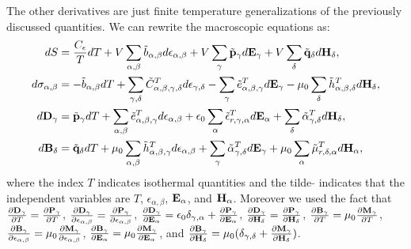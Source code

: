 \documentclass[12pt,a4paper]{article}
\begin{document}
The other derivatives are just finite temperature generalizations of the
previously discussed quantities. We can rewrite the macroscopic equations as:
\begin{align}
dS&= {C_\epsilon\over T} dT+ V \sum_{\alpha,\beta} \tilde b_{\alpha,\beta} 
d\epsilon_{\alpha,\beta}
+ V \sum_\gamma \tilde {\bf p}_\gamma d{\bf E}_{\gamma} +
V \sum_\delta \tilde {\bf q}_\delta d{\bf H}_{\delta}, \\
d\sigma_{\alpha,\beta}&= -\tilde b_{\alpha,\beta} dT + 
\sum_{\gamma,\delta} \tilde C^T_{\alpha,\beta,\gamma,\delta} 
d \epsilon_{\gamma,\delta} - \sum_\gamma \tilde e^T_{\alpha,\beta,\gamma} 
d{\bf E}_{\gamma} -\mu_0 
\sum_\delta \tilde h^T_{\alpha,\beta,\delta} d{\bf H}_{\delta}, \\
d{\bf D}_\gamma&=
\tilde {\bf p}_\gamma dT + \sum_{\alpha,\beta} \tilde 
e^T_{\alpha,\beta,\gamma} d\epsilon_{\alpha,\beta}
+\epsilon_0 \sum_\alpha \tilde \epsilon^T_{r,\gamma,\alpha} 
d{\bf E}_{\alpha} + 
\sum_\delta \tilde \alpha^T_{\gamma,\delta} d{\bf H}_{\delta}, 
\label{dsi} \\
d{\bf B}_\delta&=
\tilde {\bf q}_\delta dT+\mu_0 \sum_{\alpha,\beta}
\tilde h^T_{\alpha,\beta,\gamma}
d\epsilon_{\alpha,\beta}
+\sum_\gamma \tilde \alpha^T_{\gamma,\delta}
d{\bf E}_{\gamma}+ \mu_0
\sum_\alpha \tilde \mu^{T}_{r,\delta,\alpha}
d{\bf H}_{\alpha}, \label{bsi}
\end{align}
where the index $T$ indicates isothermal quantities and 
the tilde $\tilde{ }$ indicates that the independent variables are
$T$, $\epsilon_{\alpha,\beta}$, ${\bf E}_\alpha$, and ${\bf H}_\alpha$. 
Moreover we used the fact
that 
${\partial {\bf D}_\gamma \over \partial T} =
{\partial {\bf P}_\gamma \over \partial T}$,
${\partial {\bf D}_\gamma \over \partial \epsilon_{\alpha,\beta}}=
{\partial {\bf P}_\gamma \over \partial \epsilon_{\alpha,\beta}}$,
${\partial {\bf D}_\gamma \over \partial {\bf E}_{\alpha}}= \epsilon_0 
\delta_{\gamma,\alpha} +
{\partial {\bf P}_\gamma \over \partial {\bf E}_{\alpha}}$, 
${\partial {\bf D}_\gamma \over \partial {\bf H}_{\delta}}= 
{\partial {\bf P}_\gamma \over \partial {\bf H}_{\delta}}$, 
${\partial {\bf B}_\gamma \over \partial T} = \mu_0
{\partial {\bf M}_\gamma \over \partial T}$,
${\partial {\bf B}_\gamma \over \partial \epsilon_{\alpha,\beta}}= \mu_0
{\partial {\bf M}_\gamma \over \partial \epsilon_{\alpha,\beta}}$,
${\partial {\bf B}_\gamma \over \partial {\bf E}_{\alpha}}= \mu_0
{\partial {\bf M}_\gamma \over \partial {\bf E}_{\alpha}}$, and
${\partial {\bf B}_\gamma \over \partial {\bf H}_{\delta}}= \mu_0
(\delta_{\gamma,\delta} +
{\partial {\bf M}_\gamma \over \partial {\bf H}_{\delta}})$. 
\end{document}
